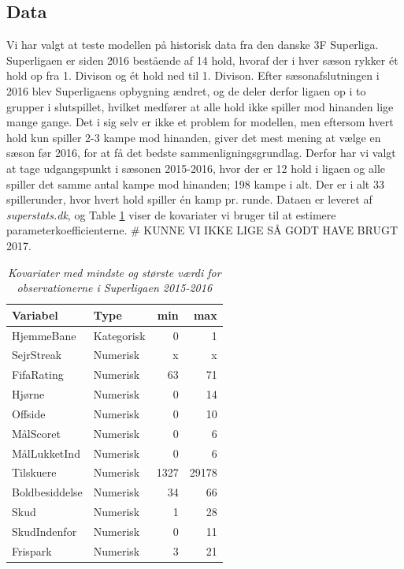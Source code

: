 \documentclass[11pt,a4paper]{article}
\begin{document}
\subsection{Data}
Vi har valgt at teste modellen på historisk data fra den danske 3F Superliga. Superligaen er siden 2016 bestående af 14 hold, hvoraf der i hver sæson rykker ét hold op fra 1. Divison og ét hold ned til 1. Divison. Efter sæsonafslutningen i 2016 blev Superligaens opbygning ændret, og de deler derfor ligaen op i to grupper i slutspillet, hvilket medfører at alle hold ikke spiller mod hinanden lige mange gange. Det i sig selv er ikke et problem for modellen, men eftersom hvert hold kun spiller 2-3 kampe mod hinanden, giver det mest mening at vælge en sæson før 2016, for at få det bedste sammenligningsgrundlag. Derfor har vi valgt at tage udgangspunkt i sæsonen 2015-2016, hvor der er 12 hold i ligaen og alle spiller det samme antal kampe mod hinanden; 198 kampe i alt. Der er i alt 33 spillerunder, hvor hvert hold spiller én kamp pr. runde. Dataen er leveret af \textit{superstats.dk}, og Table \ref{tab:Kovariater} viser de kovariater vi bruger til at estimere parameterkoefficienterne. \# KUNNE VI IKKE LIGE SÅ GODT HAVE BRUGT 2017.
\begin{table}[ht]
\centering
\begin{adjustbox}{max width=\textwidth}
\begin{tabular}{|l|lrr|}
  \hline
Variabel & Type & min & max \\ 
  \hline
HjemmeBane & Kategorisk & 0 & 1\\
SejrStreak & Numerisk & x & x\\
FifaRating & Numerisk & 63 & 71\\
Hjørne & Numerisk & 0 & 14\\
Offside & Numerisk & 0 & 10\\
MålScoret & Numerisk & 0 & 6\\
MålLukketInd & Numerisk & 0 & 6\\
Tilskuere & Numerisk & 1327 & 29178\\
Boldbesiddelse & Numerisk & 34 & 66\\
Skud & Numerisk & 1 & 28\\
SkudIndenfor & Numerisk & 0 & 11\\
Frispark & Numerisk & 3 & 21 \\
   \hline
\end{tabular}
\end{adjustbox}
\caption{\label{tab:Kovariater}\textit{Kovariater med mindste og største værdi for observationerne i Superligaen 2015-2016}}
\end{table}
\end{document}

